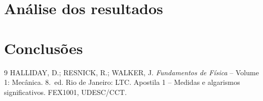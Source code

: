 \documentclass[a4paper,11pt]{article}
\begin{document}


\section{Análise dos resultados}


\section{Conclusões}


\begin{thebibliography}{9}
 HALLIDAY, D.; RESNICK, R.; WALKER, J.
  \emph{Fundamentos de Física} -- Volume 1: Mecânica.
  8.~ed. Rio de Janeiro: LTC.
 Apostila 1 -- Medidas e algarismos significativos. FEX1001, UDESC/CCT.
\end{thebibliography}
\end{document}
